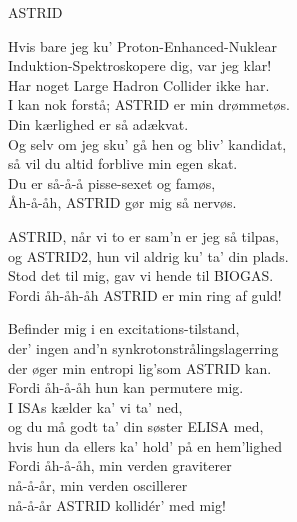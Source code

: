 \begin{song}{ASTRID}
  \begin{SBChorus}
    Hvis bare jeg ku’ Proton-Enhanced-Nuklear\\
    Induktion-Spektroskopere dig, var jeg klar!\\
    Har noget Large Hadron Collider ikke har.\\
    I kan nok forstå; ASTRID er min drømmetøs.\\\medskip
    Din kærlighed er så adækvat.\\
    Og selv om jeg sku’ gå hen og bliv’ kandidat,\\
    så vil du altid forblive min egen skat.\\
    Du er så-å-å pisse-sexet og famøs,\\
    Åh-å-åh, ASTRID gør mig så nervøs.
  \end{SBChorus}

  \begin{SBSection*}
    ASTRID, når vi to er sam’n er jeg så tilpas,\\
    og ASTRID2, hun vil aldrig ku’ ta’ din plads.\\
    Stod det til mig, gav vi hende til BIOGAS.\\
    Fordi åh-åh-åh ASTRID er min ring af guld!
  \end{SBSection*}

  \begin{SBChorus}
    Befinder mig i en excitations-tilstand,\\
    der’ ingen and’n synkrotonstrålingslagerring\\
    der øger min entropi lig’som ASTRID kan.\\
    Fordi åh-å-åh hun kan permutere mig.\\\medskip
    I ISAs kælder ka’ vi ta’ ned,\\
    og du må godt ta’ din søster ELISA med,\\
    hvis hun da ellers ka’ hold’ på en hem’lighed\\
    Fordi åh-å-åh, min verden graviterer\\
    nå-å-år, min verden oscillerer\\
    nå-å-år ASTRID kollidér’ med mig!
  \end{SBChorus}
\end{song}